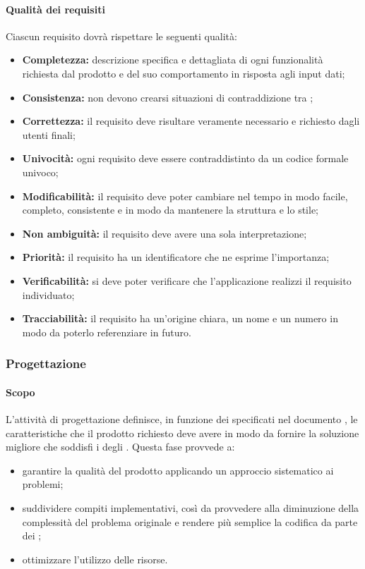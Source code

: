 \paragraph{Qualità dei requisiti}
Ciascun requisito dovrà rispettare le seguenti qualità:
\begin {itemize}
	\item \textbf{Completezza:} descrizione specifica e dettagliata di ogni funzionalità richiesta dal prodotto  e del suo comportamento in risposta agli input dati;
	\item \textbf{Consistenza:} non devono crearsi situazioni di contraddizione tra ;
	\item \textbf{Correttezza:} il requisito deve risultare veramente necessario e richiesto dagli utenti finali;
	\item \textbf{Univocità:} ogni requisito deve essere contraddistinto da un codice formale univoco;
	\item \textbf{Modificabilità:} il requisito deve poter cambiare nel tempo in modo facile, completo, consistente e in modo da mantenere la struttura e lo stile;
	\item \textbf{Non ambiguità:} il requisito deve avere una sola interpretazione;
	\item \textbf{Priorità:} il requisito ha un identificatore che ne esprime l'importanza;
	\item \textbf{Verificabilità:} si deve poter verificare che l'applicazione realizzi il requisito individuato;
	\item \textbf{Tracciabilità:} il requisito ha un'origine chiara, un nome e un numero in modo da poterlo referenziare in futuro.
\end{itemize}
\subsubsection{Progettazione}
\paragraph{Scopo}
L'attività di progettazione definisce, in funzione dei  specificati nel documento \AdR{}, le caratteristiche che il prodotto richiesto deve avere in modo da fornire la soluzione migliore che soddisfi i  degli . Questa fase provvede a:
\begin{itemize}
\item garantire la qualità del prodotto applicando un approccio sistematico ai problemi;
\item suddividere compiti implementativi, così da provvedere alla diminuzione della complessità del problema originale e rendere più semplice la codifica da parte dei \progrs{};
\item ottimizzare l'utilizzo delle risorse.
\end{itemize}
